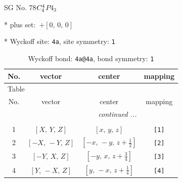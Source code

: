 \documentclass[fleqn,8pt]{jsarticle}
\begin{document}
\setcounter{MaxMatrixCols}{32}

\renewcommand{\tablename}{Table~}
\renewcommand{\figurename}{Figure~}
\begin{center}
\LARGE
SG No. 78\quad$C_{\rm 4}^{4}$\quad$P4_3$\quad[ tetragonal ]
\end{center}

* plus set:\,\,\,$+\left[ 0,\, 0,\, 0 \right]$


* Wyckoff site: {\tt 4a}, site symmetry: {\tt 1}
\renewcommand{\arraystretch}{1.2}
\begin{longtable}{cccc}
\caption{Wyckoff bond: {\tt 4a@4a}, bond symmetry: {\tt 1}}
 \\
 \hline \hline
No. & vector & center & mapping \\ \hline \endfirsthead

\multicolumn{3}{l}{\tablename\ \thetable{}} \\
 \hline \hline
No. & vector & center & mapping \\ \hline \endhead

 \hline \hline
\multicolumn{3}{r}{\footnotesize\it continued ...} \\ \endfoot

 \hline \hline
\multicolumn{3}{r}{} \\ \endlastfoot

1 & $\left[ X,\, Y,\, Z \right]$ & $\left[ x,\, y,\, z \right]$ & {\tt [1]} \\ \hline
2 & $\left[ - X,\, - Y,\, Z \right]$ & $\left[ - x,\, - y,\, z + \frac{1}{2} \right]$ & {\tt [2]} \\ \hline
3 & $\left[ - Y,\, X,\, Z \right]$ & $\left[ - y,\, x,\, z + \frac{3}{4} \right]$ & {\tt [3]} \\ \hline
4 & $\left[ Y,\, - X,\, Z \right]$ & $\left[ y,\, - x,\, z + \frac{1}{4} \right]$ & {\tt [4]} \\
\end{longtable}
\end{document}
